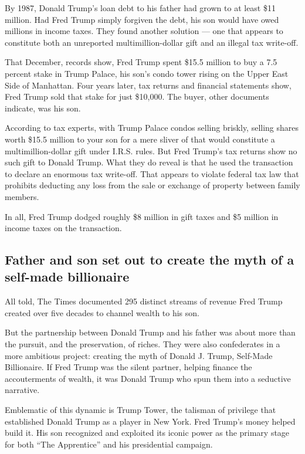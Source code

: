 By 1987, Donald Trump's loan debt to his father had grown to at least
\$11 million. Had Fred Trump simply forgiven the debt, his son would
have owed millions in income taxes. They found another solution --- one
that appears to constitute both an unreported multimillion-dollar gift
and an illegal tax write-off.

That December, records show, Fred Trump spent \$15.5 million to buy a
7.5 percent stake in Trump Palace, his son's condo tower rising on the
Upper East Side of Manhattan. Four years later, tax returns and
financial statements show, Fred Trump sold that stake for just \$10,000.
The buyer, other documents indicate, was his son.

According to tax experts, with Trump Palace condos selling briskly,
selling shares worth \$15.5 million to your son for a mere sliver of
that would constitute a multimillion-dollar gift under I.R.S. rules. But
Fred Trump's tax returns show no such gift to Donald Trump. What they do
reveal is that he used the transaction to declare an enormous tax
write-off. That appears to violate federal tax law that prohibits
deducting any loss from the sale or exchange of property between family
members.

In all, Fred Trump dodged roughly \$8 million in gift taxes and \$5
million in income taxes on the transaction.

\hypertarget{father-and-son-set-out-to-create-the-myth-of-a-self-made-billionaire}{%
\subsection{Father and son set out to create the myth of a self-made
billionaire}\label{father-and-son-set-out-to-create-the-myth-of-a-self-made-billionaire}}

All told, The Times documented 295 distinct streams of revenue Fred
Trump created over five decades to channel wealth to his son.

But the partnership between Donald Trump and his father was about more
than the pursuit, and the preservation, of riches. They were also
confederates in a more ambitious project: creating the myth of Donald J.
Trump, Self-Made Billionaire. If Fred Trump was the silent partner,
helping finance the accouterments of wealth, it was Donald Trump who
spun them into a seductive narrative.

Emblematic of this dynamic is Trump Tower, the talisman of privilege
that established Donald Trump as a player in New York. Fred Trump's
money helped build it. His son recognized and exploited its iconic power
as the primary stage for both ``The Apprentice'' and his presidential
campaign.

